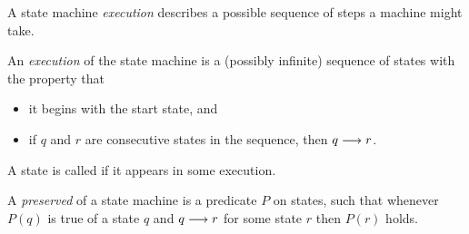 \iffalse

To formulate it precisely, we need a definition of
\term{reachability.}

\begin{definition}
The \term{reachable states} of a state machine $M$ are defined
recursively as follows:
\begin{itemize}
\item the start state is reachable, and
\item if $p$ is a reachable state of $M$, and $p \movesto q$ is a
  transition of $M$, then $q$ is also a reachable state of $M$.
\end{itemize}
\end{definition}
\fi

A state machine \emph{execution} describes a possible sequence of
steps a machine might take.

\begin{definition}
An \emph{execution}%
of the state machine is a (possibly infinite)
sequence of states with the property that
\begin{itemize}
\item it begins with the start state, and
\item if $q$ and $r$ are consecutive states in the sequence, then $q
  \mathrel{\longrightarrow} r$.
\end{itemize}
A state is called  if it appears in some execution.
\end{definition}

\begin{definition}
  A \emph{preserved} 
of a state machine is a predicate $P$ on
  states, such that whenever $P(q)$ is true of a state $q$ and $q
  \mathrel{\longrightarrow} r$ for some state $r$ then $P(r)$ holds.
\end{definition}



